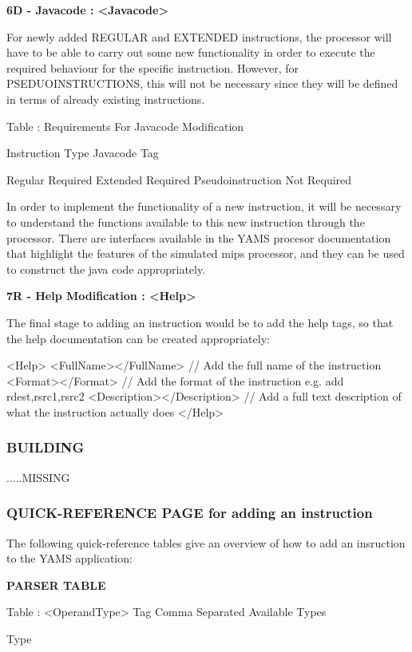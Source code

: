 \documentclass[12pt]{report}
\begin{document}
\begin{enumerate}
\textbf{6D - Javacode : <Javacode>}

For newly added REGULAR and EXTENDED instructions, the processor will have to be able to carry out some new functionality in order to execute the required behaviour for the specific instruction. However, for PSEDUOINSTRUCTIONS, this will not be necessary since they will be defined in terms of already existing instructions.

Table : Requirements For Javacode Modification

Instruction Type		Javacode Tag

Regular				Required
Extended			Required
Pseudoinstruction		Not Required

In order to implement the functionality of a new instruction, it will be necessary to understand the functions available to this new instruction through the processor. There are interfaces available in the YAMS procesor documentation that highlight the features of the simulated mips processor, and they can be used to construct the java code appropriately.




\textbf{7R - Help Modification : <Help>	}

The final stage to adding an instruction would be to add the help tags, so that the help documentation can be created appropriately:

<Help>
	<FullName></FullName>			// Add the full name of the instruction
	<Format></Format>			// Add the format of the instruction e.g. add rdest,rsrc1,rsrc2
	<Description></Description>		// Add a full text description of what the instruction actually does
</Help>


\subsubsection{BUILDING}


.....MISSING

\subsubsection{QUICK-REFERENCE PAGE for adding an instruction}

The following quick-reference tables give an overview of how to add an insruction to the YAMS application:

\textbf{PARSER TABLE}

Table : <OperandType> Tag Comma Separated Available Types

Type


\end{enumerate}
\end{document}
